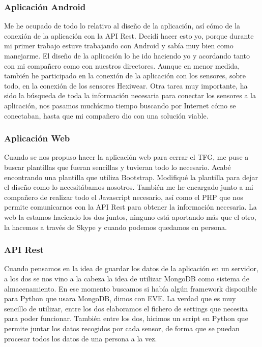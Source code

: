 \documentclass[11pt,spanish]{article}
\begin{document}
\subsubsection{Aplicación Android} 
Me he ocupado de todo lo relativo al diseño de la aplicación, así cómo de la conexión de la aplicación con la API Rest. Decidí hacer esto yo, porque durante mi primer trabajo estuve trabajando con Android y sabía muy bien como manejarme. El diseño de la aplicación lo he ido haciendo yo y acordando tanto con mi compañero como con nuestros directores. Aunque en menor medida, también he participado en la conexión de la aplicación con los sensores, sobre todo, en la conexión de los sensores Hexiwear. Otra tarea muy importante, ha sido la búsqueda de toda la información necesaria para conectar los sensores a la aplicación, nos pasamos muchísimo tiempo buscando por Internet cómo se conectaban, hasta que mi compañero dio con una solución viable.
    
\subsubsection{Aplicación Web} 
Cuando se nos propuso hacer la aplicación web para cerrar el TFG, me puse a buscar plantillas que fueran sencillas y tuvieran todo lo necesario. Acabé encontrando una plantilla que utiliza Bootstrap. Modifiqué la plantilla para dejar el diseño como lo necesitábamos nosotros. También me he encargado junto a mi compañero de realizar todo el Javascript necesario, así como el PHP que nos permite comunicarnos con la API Rest para obtener la información necesaria. La web la estamos haciendo los dos juntos, ninguno está aportando más que el otro, la hacemos a través de Skype y cuando podemos quedamos en persona.

\subsubsection{API Rest} 
Cuando pensamos en la idea de guardar los datos de la aplicación en un servidor, a los dos se nos vino a la cabeza la idea de utilizar MongoDB como sistema de almacenamiento. En ese momento buscamos si había algún framework disponible para Python que usara MongoDB, dimos con EVE. La verdad que es muy sencillo de utilizar, entre los dos elaboramos el fichero de settings que necesita para poder funcionar. También entre los dos, hicimos un script en Python que permite juntar los datos recogidos por cada sensor, de forma que se puedan procesar todos los datos de una persona a la vez.
\end{document}
